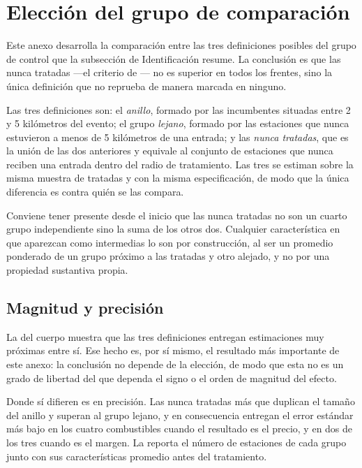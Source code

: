 \section{Elección del grupo de comparación}
\label{anexo:control}

Este anexo desarrolla la comparación entre las tres definiciones posibles del
grupo de control que la subsección de Identificación resume. La conclusión es
que las nunca tratadas —el criterio de \textcite{FISCHER2025}— no es superior en
todos los frentes, sino la única definición que no reprueba de manera marcada en
ninguno.

Las tres definiciones son: el \emph{anillo}, formado por las incumbentes
situadas entre 2 y 5 kilómetros del evento; el grupo \emph{lejano}, formado por
las estaciones que nunca estuvieron a menos de 5 kilómetros de una entrada; y
las \emph{nunca tratadas}, que es la unión de las dos anteriores y equivale al
conjunto de estaciones que nunca reciben una entrada dentro del radio de
tratamiento. Las tres se estiman sobre la misma muestra de tratadas y con la
misma especificación, de modo que la única diferencia es contra quién se las
compara.

Conviene tener presente desde el inicio que las nunca tratadas no son un cuarto
grupo independiente sino la suma de los otros dos. Cualquier característica en
que aparezcan como intermedias lo son por construcción, al ser un promedio
ponderado de un grupo próximo a las tratadas y otro alejado, y no por una
propiedad sustantiva propia.

\subsection{Magnitud y precisión}

La  del cuerpo muestra que las tres definiciones entregan
estimaciones muy próximas entre sí. Ese hecho es, por sí mismo, el resultado más
importante de este anexo: la conclusión no depende de la elección, de modo que
esta no es un grado de libertad del que dependa el signo o el orden de magnitud
del efecto.

Donde sí difieren es en precisión. Las nunca tratadas más que duplican el tamaño
del anillo y superan al grupo lejano, y en consecuencia entregan el error
estándar más bajo en los cuatro combustibles cuando el resultado es el precio, y
en dos de los tres cuando es el margen. La  reporta el número
de estaciones de cada grupo junto con sus características promedio antes del
tratamiento.

